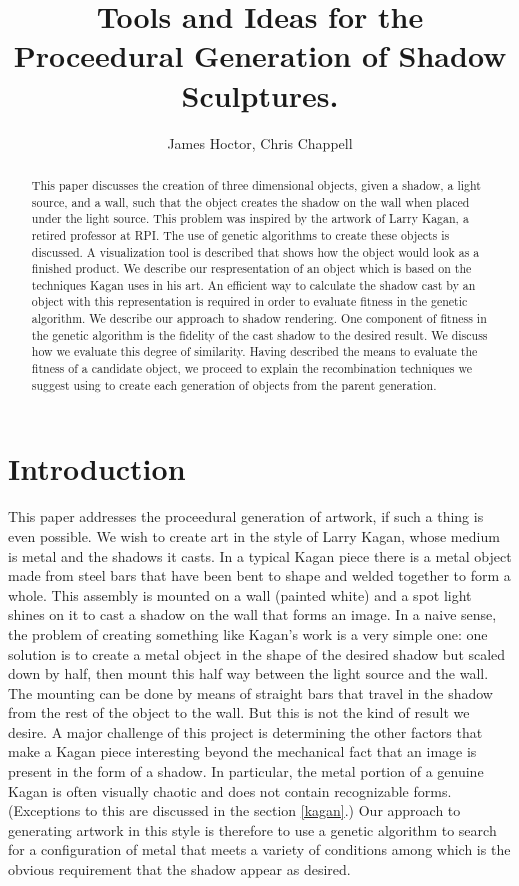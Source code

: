 \documentclass[10pt]{article}
\title{Tools and Ideas for the Proceedural Generation of Shadow Sculptures.}
\author{James Hoctor, Chris Chappell}
\begin{document}
\maketitle

\begin{abstract}
This paper discusses the creation of three dimensional objects,
given a shadow, a light source, and a wall, such that the object
creates the shadow on the wall when placed under the light source.
This problem was inspired by the artwork of Larry Kagan, a retired
professor at RPI. The use of genetic
algorithms to create these objects is discussed. A visualization
tool is described that shows how the object would look as a finished
product. We describe our respresentation of an object which is based
on the techniques Kagan uses in his art. An efficient way to
calculate the shadow cast by an object with this representation is
required in order to evaluate fitness in the genetic algorithm. We
describe our approach to shadow rendering. One component of fitness
in the genetic algorithm is the fidelity of the cast shadow to the
desired result. We discuss how we evaluate this degree of similarity.
Having described the means to evaluate the fitness of a
candidate object, we proceed to explain the recombination techniques
we suggest using to create each generation of objects from the parent generation.
\end{abstract}

\section*{Introduction}
This paper addresses the proceedural generation of artwork, if such
a thing is even possible. We wish to create art in the style of
Larry Kagan, whose medium is metal and the shadows it casts. In a
typical Kagan piece there is a metal object made from steel bars
that have been bent to shape and welded together to form a whole.
This assembly is mounted on a wall (painted white) and a spot light
shines on it to cast a shadow on the wall that forms an image. In a
naive sense, the problem  of creating something like Kagan's work is
a very simple one: one solution is to create a metal object in the shape of the desired
shadow but scaled down by half, then mount this half way between the
light source and the wall. The mounting can be done by means of
straight bars that travel in the shadow from the rest of the object
to the wall. But this is not the kind of result we desire. A major
challenge of this project is determining the other factors that make
a Kagan piece interesting beyond the mechanical fact that an image
is present in the form of a shadow. In particular, the metal portion
of a genuine Kagan is often visually chaotic and does not contain
recognizable forms. (Exceptions to this are discussed in the section
\ref{kagan}.) Our approach to generating artwork in this style
is therefore to use a genetic algorithm to search for a configuration
of metal that meets a variety of conditions among which is the
obvious requirement that the shadow appear as desired.
\end{document}
